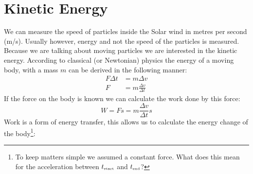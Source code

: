 \documentclass[12pt,a4paper]{article}
\numberwithin{equation}{section}
\numberwithin{figure}{section}
\numberwithin{table}{section}
\begin{document}
\section{Kinetic Energy}
We can measure the speed of particles inside the Solar wind in metres per second (m/s). Usually however, energy and not the speed of the particles is measured. Because we are talking about moving particles we are interested in the kinetic energy. According to classical (or Newtonian) physics the energy of a moving body, with a mass $m$ can be derived in the following manner:
\begin{align}
F \Delta t &= m \Delta v \\
F &= m \frac{\Delta v}{\Delta t}
\end{align}
If the force on the body is known we can calculate the work done by this force:
\begin{equation}
W = Fs = m \frac{\Delta v}{\Delta t} s
\end{equation}
Work is a form of energy transfer, this allows us to calculate the energy change of the body\footnote{To keep matters simple we assumed a constant force. What does this mean for the acceleration between $t_{\mbox{\begin{tiny}start\end{tiny}}}$ and $t_{\mbox{\begin{tiny}end\end{tiny}}}$?}:
\end{document}
